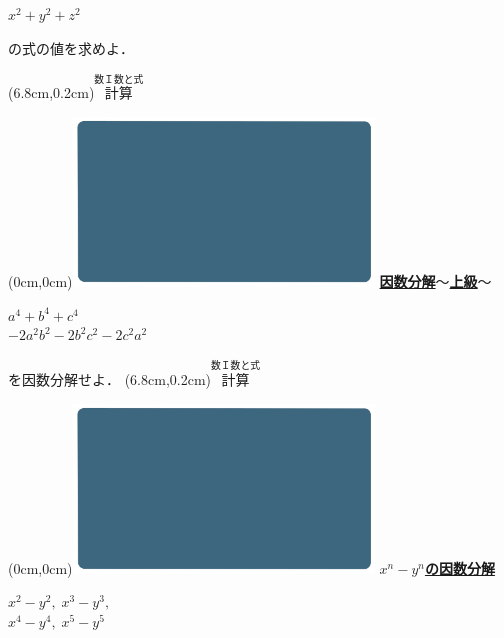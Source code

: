 \documentclass[10pt,
fleqn,
dvipdfmx,
uplatex
]{jsarticle}
\begin{document}
\fontsize{35}{0} \selectfont
\vspace{0.1zw}
\hspace{0.1zw} $x^2+y^2+z^2$
\vspace{0.05zw}

\large
\hfill の式の値を求めよ．

\at(6.8cm,0.2cm){\small\color{bradorange}$\overset{\text{数Ｉ数と式}}{\text{計算}}$}

\newpage

\at(0cm,0cm){\includegraphics[width=8cm,bb=0 0 1920 1080]{./youtube/thumbnails/templates/smart_background/数I数と式.jpeg}}
{\color{orange}\bf\boldmath\huge\underline{因数分解$〜$上級$〜$}}\vspace{0.5zw}

\Large 
\bf\boldmath 

\LARGE
$a^4+b^4+c^4$\\
\hfill$-2a^2b^2-2b^2c^2-2c^2a^2$\vspace{0.5zw}

\Large
\hfill を因数分解せよ．
\at(6.8cm,0.2cm){\small\color{bradorange}$\overset{\text{数Ｉ数と式}}{\text{計算}}$}

\newpage

\at(0cm,0cm){\includegraphics[width=8cm,bb=0 0 1920 1080]{./youtube/thumbnails/templates/smart_background/数I数と式.jpeg}}
{\color{orange}\bf\boldmath\huge\underline{$x^n-y^n$の因数分解}}\vspace{0.3zw}

\Huge 
\bf\boldmath 
\hspace{0.2zw}$x^2-y^2,\;x^3-y^3,\;$\\
\hspace{0.2zw}$x^4-y^4,\;x^5-y^5$
\end{document}
